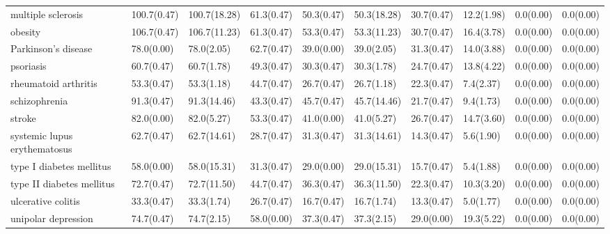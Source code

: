 \begin{table}[H]
{\begin{tabular}{llllllllll}
\addlinespace
multiple sclerosis & 100.7(0.47) & 100.7(18.28) & 61.3(0.47) & 50.3(0.47) & 50.3(18.28) & 30.7(0.47) & 12.2(1.98) & 0.0(0.00) & 0.0(0.00)\\
obesity & 106.7(0.47) & 106.7(11.23) & 61.3(0.47) & 53.3(0.47) & 53.3(11.23) & 30.7(0.47) & 16.4(3.78) & 0.0(0.00) & 0.0(0.00)\\
Parkinson's disease & 78.0(0.00) & 78.0(2.05) & 62.7(0.47) & 39.0(0.00) & 39.0(2.05) & 31.3(0.47) & 14.0(3.88) & 0.0(0.00) & 0.0(0.00)\\
psoriasis & 60.7(0.47) & 60.7(1.78) & 49.3(0.47) & 30.3(0.47) & 30.3(1.78) & 24.7(0.47) & 13.8(4.22) & 0.0(0.00) & 0.0(0.00)\\
rheumatoid arthritis & 53.3(0.47) & 53.3(1.18) & 44.7(0.47) & 26.7(0.47) & 26.7(1.18) & 22.3(0.47) & 7.4(2.37) & 0.0(0.00) & 0.0(0.00)\\
\addlinespace
schizophrenia & 91.3(0.47) & 91.3(14.46) & 43.3(0.47) & 45.7(0.47) & 45.7(14.46) & 21.7(0.47) & 9.4(1.73) & 0.0(0.00) & 0.0(0.00)\\
stroke & 82.0(0.00) & 82.0(5.27) & 53.3(0.47) & 41.0(0.00) & 41.0(5.27) & 26.7(0.47) & 14.7(3.60) & 0.0(0.00) & 0.0(0.00)\\
systemic lupus erythematosus & 62.7(0.47) & 62.7(14.61) & 28.7(0.47) & 31.3(0.47) & 31.3(14.61) & 14.3(0.47) & 5.6(1.90) & 0.0(0.00) & 0.0(0.00)\\
type I diabetes mellitus & 58.0(0.00) & 58.0(15.31) & 31.3(0.47) & 29.0(0.00) & 29.0(15.31) & 15.7(0.47) & 5.4(1.88) & 0.0(0.00) & 0.0(0.00)\\
type II diabetes mellitus & 72.7(0.47) & 72.7(11.50) & 44.7(0.47) & 36.3(0.47) & 36.3(11.50) & 22.3(0.47) & 10.3(3.20) & 0.0(0.00) & 0.0(0.00)\\
\addlinespace
ulcerative colitis & 33.3(0.47) & 33.3(1.74) & 26.7(0.47) & 16.7(0.47) & 16.7(1.74) & 13.3(0.47) & 5.0(1.77) & 0.0(0.00) & 0.0(0.00)\\
unipolar depression & 74.7(0.47) & 74.7(2.15) & 58.0(0.00) & 37.3(0.47) & 37.3(2.15) & 29.0(0.00) & 19.3(5.22) & 0.0(0.00) & 0.0(0.00)\\
\bottomrule
\end{tabular}}
\end{table}
